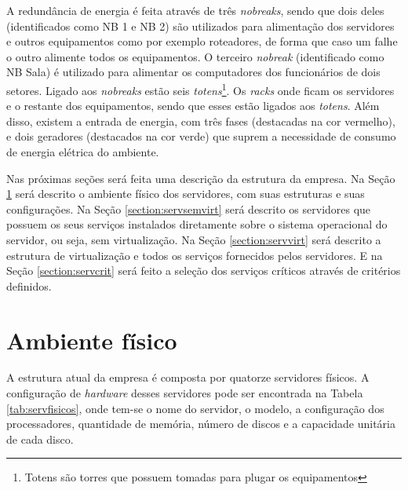 A redundância de energia é feita através de três \textit{nobreaks}, sendo que dois deles (identificados como NB 1 e NB 2) são utilizados para 
alimentação dos servidores e outros equipamentos como por exemplo roteadores, de forma que caso um falhe o outro alimente todos os equipamentos. 
O terceiro \textit{nobreak} (identificado como NB Sala) é utilizado para alimentar os computadores dos funcionários de dois setores. 
Ligado aos \textit{nobreaks} estão seis \textit{totens}\footnote[1]{Totens são torres que possuem tomadas para plugar os equipamentos}. 
Os \textit{racks} onde ficam os servidores e o restante dos equipamentos, sendo que esses estão ligados aos \textit{totens}. 
Além disso, existem a entrada de energia, com três fases (destacadas na cor vermelho), e dois geradores (destacados na cor verde) que suprem a 
necessidade de consumo de energia elétrica do ambiente.

Nas próximas seções será feita uma descrição da estrutura da empresa. Na Seção \ref{section:ambiente} será descrito o ambiente físico dos 
servidores, com suas estruturas e suas configurações. Na Seção \ref{section:servsemvirt} será descrito os servidores que possuem os seus
serviços instalados diretamente sobre o sistema operacional do servidor, ou seja, sem virtualização.
Na Seção \ref{section:servvirt} será descrito a estrutura de virtualização e todos os serviços fornecidos pelos servidores. 
E na Seção \ref{section:servcrit} será feito a seleção dos serviços críticos através de critérios definidos.

\section{Ambiente físico}
\label{section:ambiente}

A estrutura atual da empresa é composta por quatorze servidores físicos. 
A configuração de \textit{hardware} desses servidores pode ser encontrada na Tabela \ref{tab:servfisicos}, onde tem-se o nome do servidor, 
o modelo, a configuração dos processadores, quantidade de memória, número de discos e a capacidade unitária de cada disco.


